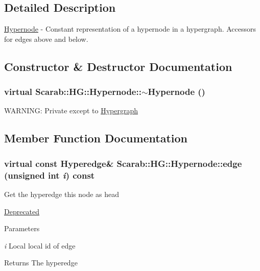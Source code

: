 \subsection{Detailed Description}
\hyperlink{classScarab_1_1HG_1_1Hypernode}{Hypernode} -\/ Constant representation of a hypernode in a hypergraph. Accessors for edges above and below. 

\subsection{Constructor \& Destructor Documentation}
\hypertarget{classScarab_1_1HG_1_1Hypernode_a0657cc96f62d29da3ae4b5b9bcab1ce6}{
\subsubsection[{$\sim$Hypernode}]{\setlength{\rightskip}{0pt plus 5cm}virtual Scarab::HG::Hypernode::$\sim$Hypernode ()}}
\label{classScarab_1_1HG_1_1Hypernode_a0657cc96f62d29da3ae4b5b9bcab1ce6}
WARNING: Private except to \hyperlink{classHypergraph}{Hypergraph} 

\subsection{Member Function Documentation}
\hypertarget{classScarab_1_1HG_1_1Hypernode_a3bface6832eb54a00d90e4fe8d1999f7}{
\subsubsection[{edge}]{\setlength{\rightskip}{0pt plus 5cm}virtual const {\bf Hyperedge}\& Scarab::HG::Hypernode::edge (unsigned int {\em i}) const}}
\label{classScarab_1_1HG_1_1Hypernode_a3bface6832eb54a00d90e4fe8d1999f7}
Get the hyperedge this node as head \begin{Desc}
\item[\hyperlink{deprecated__deprecated000009}{Deprecated}]\end{Desc}

\begin{DoxyParams}{Parameters}
\item[{\em i}]Local local id of edge\end{DoxyParams}
\begin{DoxyReturn}{Returns}
The hyperedge 
\end{DoxyReturn}


